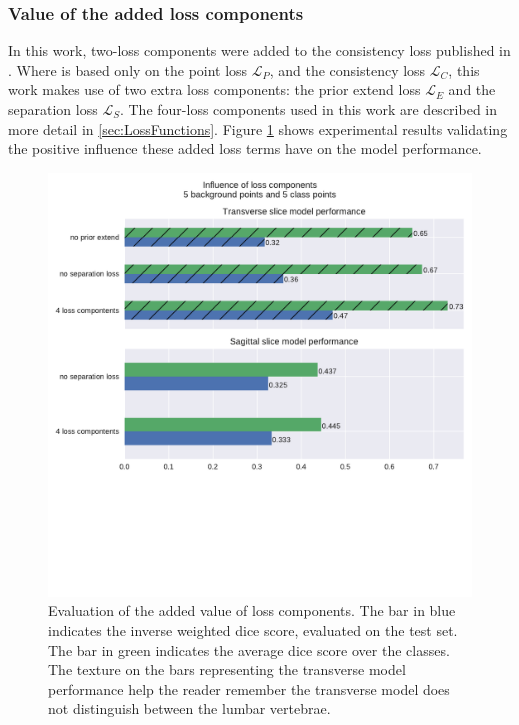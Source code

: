 \subsubsection{Value of the added loss components}
\par{
    In this work, two-loss components were added to the consistency loss published in \cite{Laradji2021}.
    Where \cite{Laradji2021} is based only on the point loss $\mathcal{L}_P$, and the consistency loss $\mathcal{L}_C$, this work makes use of two extra loss components:
    the prior extend loss $\mathcal{L}_E$ and the separation loss $\mathcal{L}_S$. The four-loss components used in this work are described in more detail in \ref{sec:LossFunctions}.
    Figure \ref{fig:addedLossComponents} shows experimental results validating the positive influence these added loss terms have on the model performance.
}
\begin{figure}
    \centering
    \includegraphics[width=.95\textwidth]{images/Losscomponents.pdf}
    \caption{Evaluation of the added value of loss components. 
    The bar in blue indicates the inverse weighted dice score, evaluated on the test set. The bar in green indicates the average dice score over the classes.
    The texture on the bars representing the transverse model performance help the reader remember the transverse model does not distinguish between the lumbar vertebrae.
    \protect
    \label{fig:addedLossComponents}}
\end{figure}

